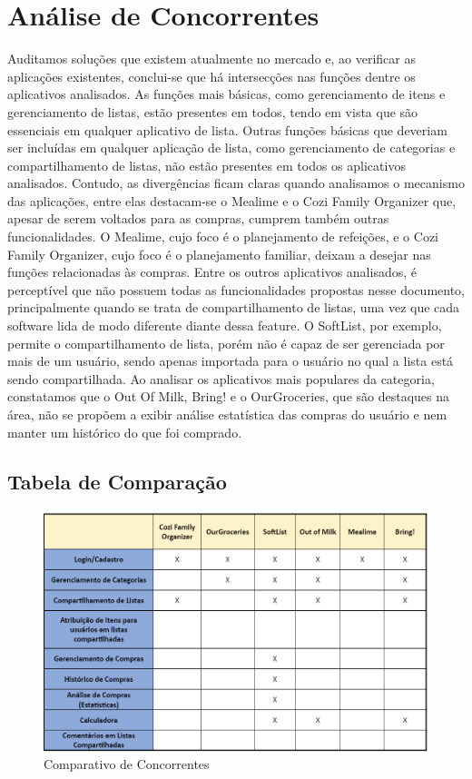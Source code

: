 \chapter{Análise de Concorrentes}
Auditamos soluções que existem atualmente no mercado e, ao verificar as aplicações existentes, conclui-se que há intersecções nas funções dentre os aplicativos analisados. As funções mais básicas, como gerenciamento de itens e gerenciamento de listas, estão presentes em todos, tendo em vista que são essenciais em qualquer aplicativo de lista. Outras funções básicas que deveriam ser incluídas em qualquer aplicação de lista, como gerenciamento de categorias e compartilhamento de listas, não estão presentes em todos os aplicativos analisados.
Contudo, as divergências ficam claras quando analisamos o mecanismo das aplicações, entre elas destacam-se o Mealime e o Cozi Family Organizer que, apesar de serem voltados para as compras, cumprem também outras funcionalidades. O Mealime, cujo foco é o planejamento de refeições, e o Cozi Family Organizer, cujo foco é o planejamento familiar, deixam a desejar nas funções relacionadas às compras.
Entre os outros aplicativos analisados, é perceptível que não possuem todas as funcionalidades propostas nesse documento, principalmente quando se trata de compartilhamento de listas, uma vez que cada software lida de modo diferente diante dessa feature. O SoftList, por exemplo, permite o compartilhamento de lista, porém não é capaz de ser gerenciada por mais de um usuário, sendo apenas importada para o usuário no qual a lista está sendo compartilhada.
Ao analisar os aplicativos mais populares da categoria, constatamos que o Out Of Milk, Bring! e o OurGroceries, que são destaques na área, não se propõem a exibir análise estatística das compras do usuário e nem manter um histórico do que foi comprado.

\pagebreak

\section{Tabela de Comparação}

	\begin{figure}[h!]
	\centering
	\includegraphics[width=.8\textwidth,height=\textheight,keepaspectratio]{./imagens/tabela_comparativa.png} 
	\caption{Comparativo de Concorrentes}
	\end{figure}
	